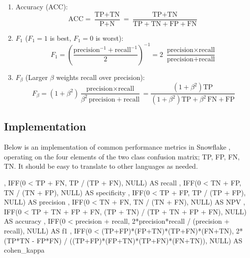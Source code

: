 \begin{enumerate}[noitemsep]
  \item Accuracy (ACC):
\begin{equation} \label{eq:ACC}
\text{ACC} = \frac{\text{TP}+\text{TN}}{\text{P}+\text{N}} = \frac{\text{TP}+\text{TN}}{\text{TP}+\text{TN}+\text{FP}+\text{FN}}
\end{equation}

  \item $F_{1}$ ($F_{1}=1$ is best, $F_{1}=0$ is worst):
\begin{equation} \label{eq:F1}
F_{1} = \left(\frac{\text{precision}^{-1}+\text{recall}^{-1}}{2}\right)^{-1} = 2\,\,\frac{\text{precision} \times \text{recall}}{\text{precision} + \text{recall}}
\end{equation}

  \item $F_{\beta}$ (Larger $\beta$ weights recall over precision):
\begin{equation} \label{eq:Fbeta}
F_{\beta} = \left(1+\beta^{2}\right) \frac{\text{precision} \times \text{recall}}{\beta^{2}\,\text{precision} + \text{recall}} =
\frac{\left(1+\beta^{2}\right) \text{TP}}{\left(1+\beta^{2}\right) \text{TP} + \beta^{2}\,\text{FN} + \text{FP}}
\end{equation}
\end{enumerate}

\subsection{\sql Implementation}
\label{ml_general:eval:sql}

Below is an implementation of common performance metrics in Snowflake \sql,
operating on the four elements of the two class confusion matrix; TP, FP, FN, TN.
It should be easy to translate to other languages as needed.

\begin{SQLcode}
, IFF(0 < TP + FN, TP / (TP + FN), NULL) AS recall
, IFF(0 < TN + FP, TN / (TN + FP), NULL) AS specificity
, IFF(0 < TP + FP, TP / (TP + FP), NULL) AS precision
, IFF(0 < TN + FN, TN / (TN + FN), NULL) AS NPV
, IFF(0 < TP + TN + FP + FN, (TP + TN) / (TP + TN + FP + FN), NULL) AS accuracy
, IFF(0 < precision + recall, 2*precision*recall / (precision + recall), NULL) AS f1
, IFF(0 < (TP+FP)*(FP+TN)*(TP+FN)*(FN+TN), 2*(TP*TN - FP*FN) / ((TP+FP)*(FP+TN)*(TP+FN)*(FN+TN)), NULL) AS cohen_kappa
\end{SQLcode}

